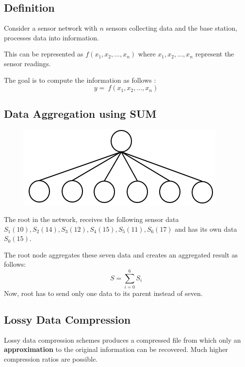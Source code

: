\documentclass[%
  slidesonly,%
  semlayer%
  ]{seminar}                                  %
\begin{document}
\begin{slide}
  \subsection*{Definition}
      \vfill
      Consider a sensor network with $n$ sensors collecting data and the base station, processes data into information. 
      
      This can be represented as $f(x_{1}, x_{2},...,x_{n})$ where $x_{1}, x_{2},..., x_{n}$ represent the sensor readings.
      

      The goal is to compute the information as follows :
      \begin{equation*}
        y =\ f(x_{1}, x_{2},...,x_{n})
      \end{equation*}
      \vfill
      \clearpage

  \subsection*{Data Aggregation using SUM}
    \vfill      
    \begin{figure}
      \centering
      \includegraphics[scale = 0.4]{images/star-tree.png}
    \end{figure}

    The root in the network, receives the following sensor data $S_{1}(10), S_{2}(14), S_{3}(12), S_{4}(15), S_{5}(11),S_{6}(17)$ and has its own data $S_{0}(15)$. 

    The root node aggregates these seven data and creates an aggregated result as follows:
    \begin{equation}
      S = \sum_{i=0}^6 S_{i}
    \end{equation}
    Now, root has to send only one data to its parent instead of seven.
    \vfill
    \clearpage

  \subsection*{Lossy Data Compression}
    \vfill
    Lossy data compression schemes produces a compressed file from which only an \textbf{approximation} to the original information can be recovered. Much higher compression ratios are possible.


\end{slide}
\end{document}
